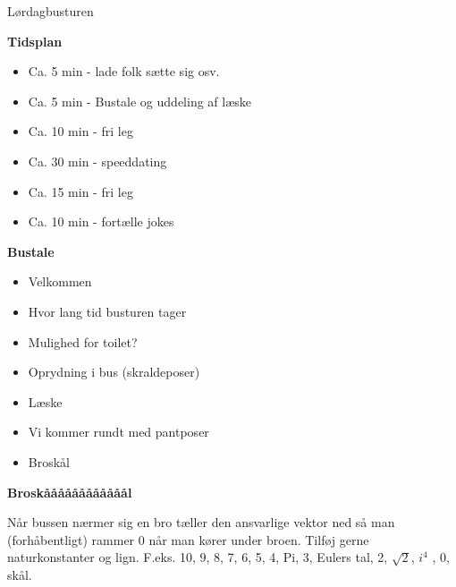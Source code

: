 \documentclass[../../../main.tex]{subfiles}
\begin{document}
\begin{mats}{Lørdag}{busturen}
\end{mats}

\textbf{Tidsplan}
\begin{itemize}
    \item Ca. 5 min - lade folk sætte sig osv.
    \item Ca. 5 min - Bustale og uddeling af læske
    \item Ca. 10 min - fri leg
    \item Ca. 30 min - speeddating
    \item Ca. 15 min - fri leg
    \item Ca. 10 min - fortælle jokes
\end{itemize}

\textbf{Bustale}
\begin{itemize}
    \item Velkommen
    \item Hvor lang tid busturen tager
    \item Mulighed for toilet?
    \item Oprydning i bus (skraldeposer)
    \item Læske
    \item Vi kommer rundt med pantposer
    \item Broskål
\end{itemize}

\textbf{Broskåååååååååååål}

Når bussen nærmer sig en bro tæller den ansvarlige vektor ned så man (forhåbentligt) rammer 0 når man kører under broen. Tilføj gerne naturkonstanter og lign. F.eks. 10, 9, 8, 7, 6, 5, 4, Pi, 3, Eulers tal, 2, $\sqrt{2}$, $i^4$ , 0, skål.
\end{document}
